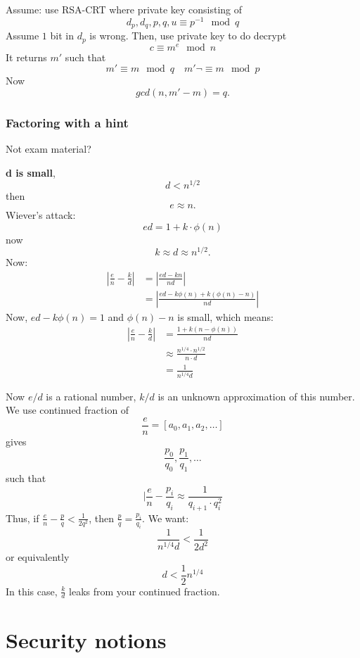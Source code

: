 \documentclass[language=english,number=]{homework}
\begin{document}
    Assume: use RSA-CRT where private key consisting of
    \[
        d_p,d_q,p,q,u \equiv p^{-1} \mod q
    \]
    Assume $1$ bit in $d_p$ is wrong.
    Then, use private key to do decrypt
    \[
        c \equiv m^{e} \mod n
    \]
    It returns $m'$ such that
    \[
        m' \equiv m \mod q \quad m' \neg \equiv m \mod p
    \]
    Now
    \[
        gcd(n,m'-m) = q.
    \]

    \subsubsection{Factoring with a hint}

    Not exam material?

    \textbf{d is small},
    \[
        d < n^{1/2}
    \]
    then
    \[
        e \approx n.
    \]
    Wiever's attack:
    \[
        ed = 1 + k \cdot \phi(n)
    \]
    now
    \[
        k \approx d \approx n^{1/2}.
    \]
    Now:
    \begin{align*}
        |\frac{e}{n} - \frac{k}{d}| &= |\frac{ed - kn}{nd}| \\
        &= | \frac{ed - k \phi(n) + k(\phi(n) - n)}{nd} |
    \end{align*}
    Now, $ed - k \phi(n) = 1$ and $\phi(n) - n$ is small, which means:
    \begin{align*}
        |\frac{e}{n} - \frac{k}{d}| &= \frac{1 + k (n - \phi(n))}{nd} \\
        &\approx \frac{n^{1/4}\cdot n^{1/2}}{n \cdot d} \\
        &= \frac{1}{n^{1/4} d}
    \end{align*}

    Now $e/d$ is a rational number, $k/d$ is an unknown approximation of this number.
    We use continued fraction of
    \[
        \frac{e}{n} = [a_0,a_1,a_2,\dots]
    \]
    gives
    \[
        \frac{p_0}{q_0}, \frac{p_1}{q_1},\dots
    \]
    such that
    \[
        |\frac{e}{n} - \frac{p_i}{q_i} \approx \frac{1}{q_{i+1} \cdot q_i^2}
    \]
    Thus, if $\frac{e}{n} - \frac{p}{q} < \frac{1}{2 q^2}$, then $\frac{p}{q} = \frac{p_i}{q_i}$.
    We want:
    \[
        \frac{1}{n^{1/4}d} < \frac{1}{2d^2}
    \]
    or equivalently
    \[
        d < \frac{1}{2} n^{1/4}
    \]
    In this case, $\frac{k}{d}$ leaks from your continued fraction.

    \newpage
    \section{Security notions}
\end{document}
